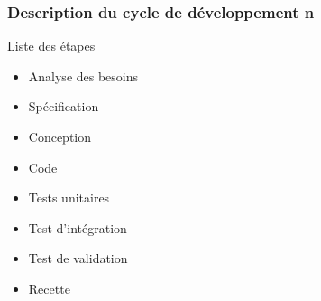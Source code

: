         \subsubsection{Description du cycle de développement n}

            \par{Liste des étapes}
                \begin{itemize}
                    \item Analyse des besoins
                    \item Spécification
                    \item Conception
                    \item Code
                    \item Tests unitaires
                    \item Test d'intégration
                    \item Test de validation
                    \item Recette
                \end{itemize}
            

\pagebreak
